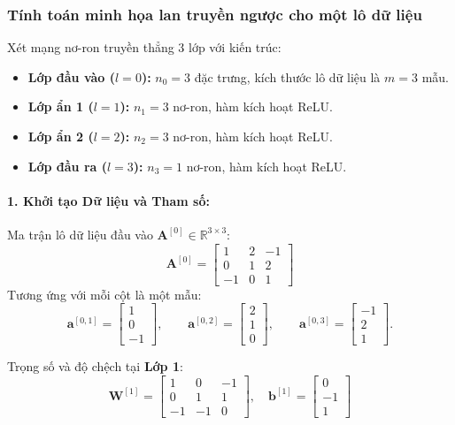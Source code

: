 \subsubsection{Tính toán minh họa lan truyền ngược cho một lô dữ liệu}
Xét mạng nơ-ron truyền thẳng 3 lớp với kiến trúc:
\begin{itemize}
    \item \textbf{Lớp đầu vào ($l=0$):} $n_0 = 3$ đặc trưng, kích thước lô dữ liệu là $m = 3$ mẫu.
    \item \textbf{Lớp ẩn 1 ($l=1$):} $n_1 = 3$ nơ-ron, hàm kích hoạt ReLU.
    \item \textbf{Lớp ẩn 2 ($l=2$):} $n_2 = 3$ nơ-ron, hàm kích hoạt ReLU.
    \item \textbf{Lớp đầu ra ($l=3$):} $n_3 = 1$ nơ-ron, hàm kích hoạt ReLU.
\end{itemize}

\paragraph{1. Khởi tạo Dữ liệu và Tham số:}
Ma trận lô dữ liệu đầu vào $\mathbf{A}^{[0]} \in \mathbb{R}^{3 \times 3}$:
\begin{equation}
\mathbf{A}^{[0]} =
\begin{bmatrix}
    1 & 2 & -1 \\
    0 & 1 & 2 \\
    -1 & 0 & 1
\end{bmatrix}
\end{equation}
Tương ứng với mỗi cột là một mẫu:
\[
\mathbf{a}^{[0,1]} = \begin{bmatrix} 1 \\ 0 \\ -1 \end{bmatrix}, \qquad
\mathbf{a}^{[0,2]} = \begin{bmatrix} 2 \\ 1 \\ 0 \end{bmatrix}, \qquad
\mathbf{a}^{[0,3]} = \begin{bmatrix} -1 \\ 2 \\ 1 \end{bmatrix}.
\]

Trọng số và độ chệch tại \textbf{Lớp 1}:
\begin{equation}
\mathbf{W}^{[1]} =
\begin{bmatrix}
    1 & 0 & -1 \\
    0 & 1 & 1 \\
    -1 & -1 & 0
\end{bmatrix},
\quad
\mathbf{b}^{[1]} =
\begin{bmatrix}
    0 \\ -1 \\ 1
\end{bmatrix}
\end{equation}

